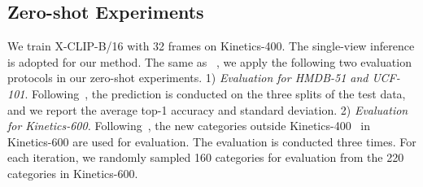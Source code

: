 \documentclass[runningheads]{llncs}
\begin{document}
\subsection{Zero-shot Experiments}\label{sec:split_zero}
We train X-CLIP-B/16 with 32 frames on Kinetics-400. The single-view inference is adopted for our method. The same as ~\cite{chen2021elaborative,clip}, we apply the following two evaluation protocols in our zero-shot experiments. 1) \textit{Evaluation for HMDB-51 and UCF-101}. Following~\cite{clip}, the prediction is conducted on the three splits of the test data, and we report the average top-1 accuracy and standard deviation. 2) \textit{Evaluation for Kinetics-600.} Following~\cite{chen2021elaborative}, the  new categories outside Kinetics-400~\cite{k400} in Kinetics-600 are used for evaluation. The evaluation is conducted three times. For each iteration, we randomly sampled 160 categories for evaluation from the 220 categories in Kinetics-600.
\end{document}
